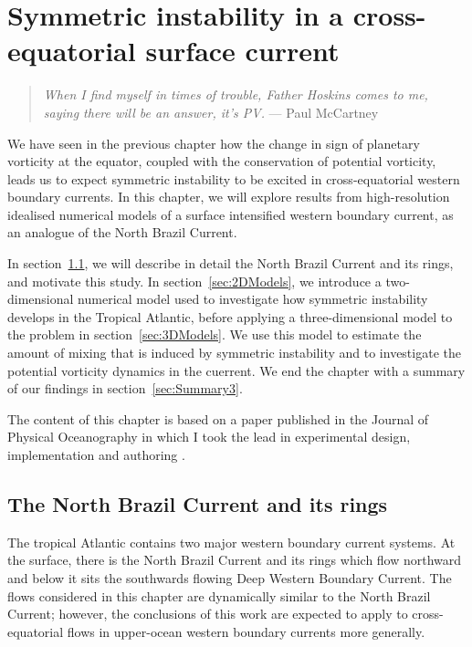 \chapter{Symmetric instability in a cross-equatorial surface current}
\label{chap:3}
\begin{quote}
    \textit{When I find myself in times of trouble, Father Hoskins comes to me, saying there will be an answer, it's PV.} --- Paul McCartney
\end{quote}

We have seen in the previous chapter how the change in sign of planetary vorticity at the equator, coupled with the conservation of potential vorticity, leads us to expect symmetric instability to be excited in cross-equatorial western boundary currents. In this chapter, we will explore results from high-resolution idealised numerical models of a surface intensified western boundary current, as an analogue of the North Brazil Current.

In section~\ref{sec:NBCandR}, we will describe in detail the North Brazil Current and its rings, and motivate this study. In section~\ref{sec:2DModels}, we introduce a two-dimensional numerical model used to investigate how symmetric instability develops in the Tropical Atlantic, before applying a three-dimensional model to the problem in section~\ref{sec:3DModels}. We use this model to estimate the amount of mixing that is induced by symmetric instability and to investigate the potential vorticity dynamics in the cuerrent. We end the chapter with a summary of our findings in section~\ref{sec:Summary3}.

The content of this chapter is based on a paper published in the Journal of Physical Oceanography in which I took the lead in experimental design, implementation and authoring \citep{Goldsworth2021}.

\section{The North Brazil Current and its rings}
\label{sec:NBCandR}
The tropical Atlantic contains two major western boundary current systems. At the surface, there is the North Brazil Current and its rings which flow northward and below it sits the southwards flowing Deep Western Boundary Current. The flows considered in this chapter are dynamically similar to the North Brazil Current; however, the conclusions of this work are expected to apply to cross-equatorial flows in upper-ocean western boundary currents more generally.

